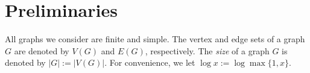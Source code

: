 \documentclass[kpfonts]{patmorin}
\newcommand{\snote}[1]{\fcolorbox{red}{yellow}{#1}}
\DeclareMathOperator{\A}{\mathds{A}}
\begin{document}
% 
% 
% 


% 



\section{Preliminaries}

All graphs we consider are finite and simple.  The vertex and edge sets of a graph $G$ are denoted by $V(G)$ and $E(G)$, respectively.  The \emph{size} of a graph $G$ is denoted by $|G|:=|V(G)|$. 
For convenience, we let $\log x := \log\max\{1,x\}$. 
\end{document}
